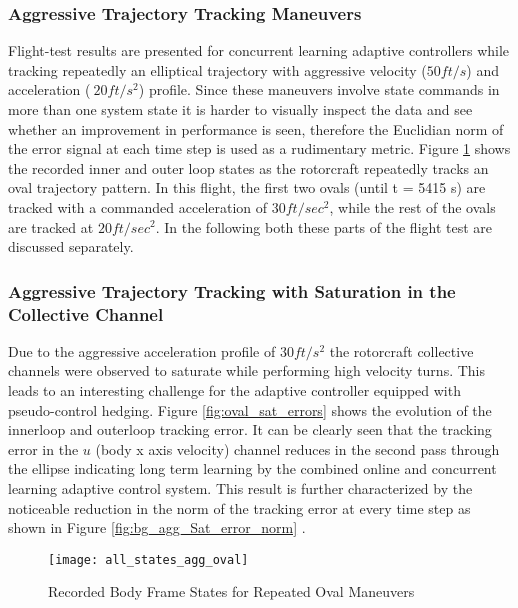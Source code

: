 \subsubsection{Aggressive Trajectory Tracking Maneuvers}
Flight-test results are presented for concurrent learning adaptive controllers while tracking repeatedly an elliptical trajectory with aggressive velocity ($50 ft/s$) and acceleration ($~20 ft/s^2$) profile. Since these maneuvers involve state commands in more than one system state it is harder to visually inspect the data and see whether an improvement in performance is seen, therefore the Euclidian norm of the error signal at each time step is used as a rudimentary metric. Figure \ref{fig:all_states_agg_ovals} shows the recorded inner and outer loop states as the rotorcraft repeatedly tracks an oval trajectory pattern. In this flight, the first two ovals (until t = 5415 s) are tracked with a commanded acceleration of $30ft/sec^2$, while the rest of the ovals are tracked at $20ft/sec^2$. In the following both these parts of the flight test are discussed separately.

\subsubsection{Aggressive Trajectory Tracking with Saturation in the Collective Channel}
\label{sec:bg_oval}
Due to the aggressive acceleration profile of $30ft/s^2$ the rotorcraft collective channels were observed to saturate while performing high velocity turns. This leads to an interesting challenge for the adaptive controller equipped with pseudo-control hedging. Figure \ref{fig:oval_sat_errors} shows the evolution of the innerloop and outerloop tracking error. It can be clearly seen that the tracking error in the $u$ (body x axis velocity) channel reduces in the second pass through the ellipse indicating long term learning by the combined online and concurrent learning adaptive control system. This result is further characterized by the noticeable reduction in the norm of the tracking error at every time step as shown in Figure \ref{fig:bg_agg_Sat_error_norm} .



\begin{figure}[H]
\centering
\texttt{[image: all\_states\_agg\_oval]}
\caption{Recorded Body Frame States for Repeated Oval Maneuvers}
\label{fig:all_states_agg_ovals}
\end{figure}

